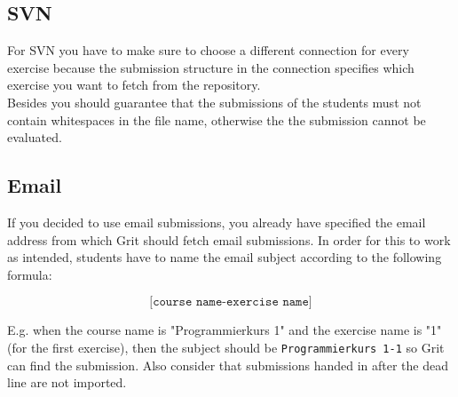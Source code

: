 \documentclass[10pt,a4paper, titlepage, toc=idx]{scrreprt}
\theoremstyle{definition}
\theoremstyle{plain}
\newcommand*{\product}{Grit}
\begin{document}
       \subsection{SVN}
       For SVN you have to make sure to choose a different connection
       for every exercise because the submission structure in the
       connection specifies which exercise you want to fetch from the
       repository.\\
       Besides you should guarantee that the submissions of the students must not contain whitespaces in the file name, otherwise the the submission cannot be evaluated.

       \subsection{Email}
       If you decided to use email submissions, you already have
       specified the email address from which \product{} should fetch
       email submissions. In order for this to work as intended,
       students have to name the email subject according to the
       following formula:

       \[ \texttt{[course name-exercise name]} \]

       E.g. when the course name is "Programmierkurs 1" and the
       exercise name is "1" (for the first exercise), then the
       subject should be \texttt{Programmierkurs 1-1} so \product{} can
       find the submission. Also consider that submissions handed in
       after the dead line are not imported.
       
\end{document}

